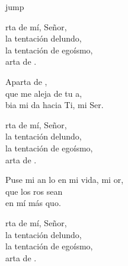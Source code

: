 \begin{cancion}jump\\
	\begin{chorus}%
		rta de mí, Señor,\\
		la tentación delundo,\\
		la tentación de egoísmo, \\
		arta de .\jump\\
	\end{chorus}%
	Aparta de , \\
	que me aleja de tu a,\\
	bia mi da hacia Ti, mi Ser.\jump\\
	\begin{chorus}%
		rta de mí, Señor,\\
		la tentación delundo,\\
		la tentación de egoísmo, \\
		arta de .\jump\\
	\end{chorus}%
	Puse mi an lo en mi vida, mi or,\\
	 que los ros sean \\
	en mí más quo.\jump\\
	\begin{chorus}%
		rta de mí, Señor,\\
		la tentación delundo,\\
		la tentación de egoísmo, \\
		arta de .\jump\\
	\end{chorus}%
\end{cancion}%
